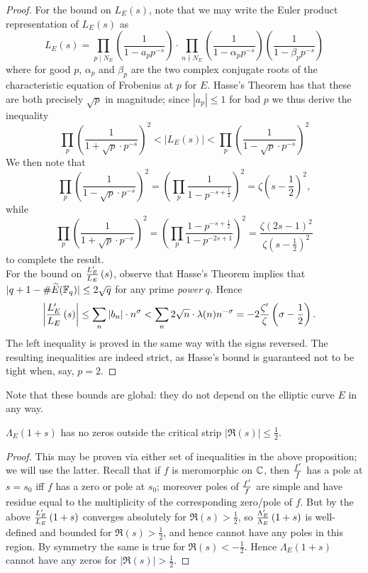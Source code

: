 \begin{proof}
For the bound on $L_E(s)$, note that we may write the Euler product representation of $L_E(s)$ as
\begin{equation}
L_E(s) = \prod_{p \mid N_E} \left(\frac{1}{1-a_p p^{-s}}\right) \cdot \prod_{n \nmid N_E} \left(\frac{1}{1-\alpha_p p^{-s}}\right)\left(\frac{1}{1-\beta_p p^{-s}}\right)
\end{equation}
where for good $p$, $\alpha_p$ and $\beta_p$ are the two complex conjugate roots of the characteristic equation of Frobenius at $p$ for $E$. Hasse's Theorem has that these are both precisely $\sqrt{p}$ in magnitude; since $|a_p|\le 1$ for bad $p$ we thus derive the inequality
\begin{equation}
\prod_p \left(\frac{1}{1+ \sqrt{p}\cdot p^{-s}}\right)^2 < \left|L_E(s)\right| < \prod_p \left(\frac{1}{1- \sqrt{p}\cdot p^{-s}}\right)^2
\end{equation}
We then note that 
\[ \prod_p \left(\frac{1}{1- \sqrt{p}\cdot p^{-s}}\right)^2 = \left(\prod_p \frac{1}{1- p^{-s+\frac{1}{2}}}\right)^2 = \zeta(s-\frac{1}{2})^2,\] 
while
\[ \prod_p \left(\frac{1}{1+ \sqrt{p}\cdot p^{-s}}\right)^2 = \left(\prod_p \frac{1- p^{-s+\frac{1}{2}}}{1- p^{-2s+1}}\right)^2 = \frac{\zeta(2s-1)^2}{\zeta(s-\frac{1}{2})^2}\]
to complete the result. \\ 

For the bound on $\frac{L_E^{\prime}}{L_E}\left(s\right)$, observe that Hasse's Theorem implies that $|q + 1 - \#\widetilde{E}(\mathbb{F}_{q})| \le 2\sqrt{q}$ for any prime {\it power} $q$. Hence
\begin{align*}
\left| \frac{L_E^{\prime}}{L_E}\left(s\right)\right| &\le \sum_n |b_n| \cdot n^\sigma < \sum_{n} 2\sqrt{n} \cdot \lambda(n) n^{-\sigma}  = -2\frac{\zeta^{\prime}}{\zeta}\left(\sigma-\frac{1}{2}\right).
\end{align*}
The left inequality is proved in the same way with the signs reversed. The resulting inequalities are indeed strict, as Hasse's bound is guaranteed not to be tight when, say, $p=2$.
\end{proof}
Note that these bounds are global: they do not depend on the elliptic curve $E$ in any way.

\begin{corollary}
$\Lambda_E(1+s)$ has no zeros outside the critical strip $|\Re(s)| \le \frac{1}{2}$.
\end{corollary}
\begin{proof}
This may be proven via either set of inequalities in the above proposition; we will use the latter. Recall that if $f$ is meromorphic on $\mathbb{C}$, then $\frac{f^{\prime}}{f}$ has a pole at $s=s_0$ iff $f$ has a zero or pole at $s_0$; moreover poles of $\frac{f^{\prime}}{f}$ are simple and have residue equal to the multiplicity of the corresponding zero/pole of $f$. But by the above $\frac{L_E^{\prime}}{L_E}\left(1+s\right)$ converges absolutely for $\Re(s)>\frac{1}{2}$, so $\frac{\Lambda_E^{\prime}}{\Lambda_E}\left(1+s\right)$ is well-defined and bounded for $\Re(s)>\frac{1}{2}$, and hence cannot have any poles in this region. By symmetry the same is true for $\Re(s)<-\frac{1}{2}$. Hence $\Lambda_E(1+s)$ cannot have any zeros for $|\Re(s)| > \frac{1}{2}$.
\end{proof}

